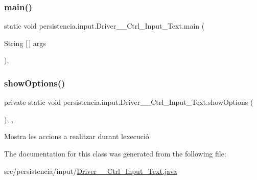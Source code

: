 \subsubsection{\texorpdfstring{main()}{main()}}
{\footnotesize\ttfamily static void persistencia.\+input.\+Driver\+\_\+\+\_\+\+Ctrl\+\_\+\+Input\+\_\+\+Text.\+main (\begin{DoxyParamCaption}\item[{String \mbox{[}$\,$\mbox{]}}]{args }\end{DoxyParamCaption})\hspace{0.3cm}{\ttfamily [inline]}, {\ttfamily [static]}}

\mbox{\label{classpersistencia_1_1input_1_1Driver____Ctrl__Input__Text_a51d02aa85468b0924d13e4060106459e}} 
\subsubsection{\texorpdfstring{show\+Options()}{showOptions()}}
{\footnotesize\ttfamily private static void persistencia.\+input.\+Driver\+\_\+\+\_\+\+Ctrl\+\_\+\+Input\+\_\+\+Text.\+show\+Options (\begin{DoxyParamCaption}{ }\end{DoxyParamCaption})\hspace{0.3cm}{\ttfamily [inline]}, {\ttfamily [static]}, {\ttfamily [private]}}



Mostra les accions a realitzar durant l\textquotesingle{}execució 



The documentation for this class was generated from the following file\+:\begin{DoxyCompactItemize}
\item 
src/persistencia/input/\hyperlink{Driver____Ctrl__Input__Text_8java}{Driver\+\_\+\+\_\+\+Ctrl\+\_\+\+Input\+\_\+\+Text.\+java}\end{DoxyCompactItemize}
